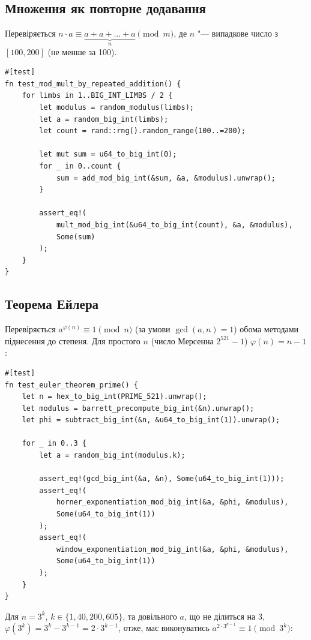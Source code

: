 \documentclass[11pt]{article}
\begin{document}
\subsection{Множення як повторне додавання}

Перевіряється $n \cdot a \equiv \underbrace{a + a + \dots + a}_{n} \pmod{m}$,
де $n$ "--- випадкове число з $[100, 200]$ (не менше за 100).

\begin{lstlisting}[style=ruststyle]
#[test]
fn test_mod_mult_by_repeated_addition() {
    for limbs in 1..BIG_INT_LIMBS / 2 {
        let modulus = random_modulus(limbs);
        let a = random_big_int(limbs);
        let count = rand::rng().random_range(100..=200);

        let mut sum = u64_to_big_int(0);
        for _ in 0..count {
            sum = add_mod_big_int(&sum, &a, &modulus).unwrap();
        }

        assert_eq!(
            mult_mod_big_int(&u64_to_big_int(count), &a, &modulus),
            Some(sum)
        );
    }
}
\end{lstlisting}

\subsection{Теорема Ейлера}

Перевіряється $a^{\varphi(n)} \equiv 1 \pmod{n}$ (за умови $\gcd(a, n) = 1$)
обома методами піднесення до степеня. Для простого $n$ (число Мерсенна
$2^{521} - 1$) $\varphi(n) = n - 1$:

\begin{lstlisting}[style=ruststyle]
#[test]
fn test_euler_theorem_prime() {
    let n = hex_to_big_int(PRIME_521).unwrap();
    let modulus = barrett_precompute_big_int(&n).unwrap();
    let phi = subtract_big_int(&n, &u64_to_big_int(1)).unwrap();

    for _ in 0..3 {
        let a = random_big_int(modulus.k);

        assert_eq!(gcd_big_int(&a, &n), Some(u64_to_big_int(1)));
        assert_eq!(
            horner_exponentiation_mod_big_int(&a, &phi, &modulus),
            Some(u64_to_big_int(1))
        );
        assert_eq!(
            window_exponentiation_mod_big_int(&a, &phi, &modulus),
            Some(u64_to_big_int(1))
        );
    }
}
\end{lstlisting}

Для $n = 3^k$, $k \in \{1, 40, 200, 605\}$, та довільного $a$, що не ділиться на 3,
$\varphi(3^k) = 3^k - 3^{k-1} = 2 \cdot 3^{k-1}$, отже, має виконуватись
$a^{2 \cdot 3^{k-1}} \equiv 1 \pmod{3^k}$:
\end{document}
